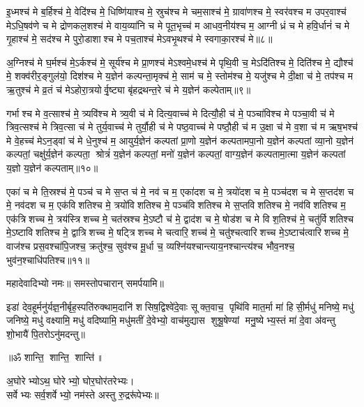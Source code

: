 इ॒ध्मश्च॑ मे ब॒र्हिश्च॑ मे॒ वेदि॑श्च मे॒ धिष्णि॑याश्च मे॒ स्रुच॑श्च मे चम॒साश्च॑ मे॒ ग्रावा॑णश्च मे॒ स्वर॑वश्च म उपर॒वाश्च॑ मेऽधि॒षव॑णे च मे द्रोणकल॒शश्च॑ मे वाय॒व्या॑नि च मे पूत॒भृच्च॑ म आधव॒नीय॑श्च म॒ आग्नीध्रं च मे हवि॒र्धानं॑ च मे गृ॒हाश्च॑ मे॒ सद॑श्च मे पुरो॒डाशाश्च मे पच॒ताश्च॑ मेऽवभृ॒थश्च॑ मे स्वगाका॒रश्च॑ मे॥८॥ 

अ॒ग्निश्च॑ मे घ॒र्मश्च॑ मे॒ऽर्कश्च॑ मे॒ सूर्य॑श्च मे प्रा॒णश्च॑ मेऽश्वमे॒धश्च॑ मे पृथि॒वी च॒ मेऽदि॑तिश्च मे॒ दिति॑श्च मे॒ द्यौश्च॑ मे॒ शक्व॑रीर॒ङ्गुल॑यो॒ दिश॑श्च मे य॒ज्ञेन॑ कल्पन्ता॒मृक्च॑ मे॒ साम॑ च मे॒ स्तोम॑श्च मे॒ यजु॑श्च मे दी॒क्षा च॑ मे॒ तप॑श्च म ऋ॒तुश्च॑ मे व्र॒तं च॑ मेऽहोरा॒त्रयोर्वृ॒ष्ट्या बृ॑हद्रथन्त॒रे च॑ मे य॒ज्ञेन॑ कल्पेताम्॥९॥ 

गर्भाश्च मे व॒त्साश्च॑ मे॒ त्र्यवि॑श्च मे त्र्य॒वी च॑ मे दित्य॒वाच्च॑ मे दित्यौ॒ही च॑ मे॒ पञ्चा॑विश्च मे पञ्चा॒वी च॑ मे त्रिव॒त्सश्च॑ मे त्रिव॒त्सा च॑ मे तुर्य॒वाच्च॑ मे तुर्यौ॒ही च॑ मे पष्ठ॒वाच्च॑ मे पष्ठौ॒ही च॑ म उ॒क्षा च॑ मे व॒शा च॑ म ऋष॒भश्च॑ मे वे॒हच्च॑ मेऽन॒ड्वां च॑ मे धे॒नुश्च॑ म॒ आयुर्य॒ज्ञेन॑ कल्पतां प्रा॒णो य॒ज्ञेन॑ कल्पतामपा॒नो य॒ज्ञेन॑ कल्पतां व्या॒नो य॒ज्ञेन॑ कल्पतां॒ चक्षु॑र्य॒ज्ञेन॑ कल्पता॒ श्रोत्रं॑ य॒ज्ञेन॑ कल्पतां॒ मनो॑ य॒ज्ञेन॑ कल्पतां॒ वाग्य॒ज्ञेन॑ कल्पतामा॒त्मा य॒ज्ञेन॑ कल्पतां य॒ज्ञो य॒ज्ञेन॑ कल्पताम्॥१०॥ 

एका॑ च मे ति॒स्रश्च॑ मे॒ पञ्च॑ च मे स॒प्त च॑ मे॒ नव॑ च म॒ एका॑दश च मे॒ त्रयो॑दश च मे॒ पञ्च॑दश च मे स॒प्तद॑श च मे॒ नव॑दश च म॒ एक॑विशतिश्च मे॒ त्रयो॑विशतिश्च मे॒ पञ्च॑विशतिश्च मे स॒प्तविशतिश्च मे॒ नव॑विशतिश्च म॒ एक॑त्रिशच्च मे॒ त्रय॑स्त्रिशच्च मे॒ चत॑स्रश्च मे॒ऽष्टौ च॑ मे॒ द्वाद॑श च मे॒ षोड॑श च मे विश॒तिश्च॑ मे॒ चतु॑र्विशतिश्च मे॒ऽष्टाविशतिश्च मे॒ द्वात्रिशच्च मे॒ षट्त्रिशच्च मे चत्वारि॒शच्च॑ मे॒ चतु॑श्चत्वारिशच्च मे॒ऽष्टाच॑त्वारिशच्च मे॒ वाज॑श्च प्रस॒वश्चा॑पि॒जश्च॒ क्रतु॑श्च॒ सुव॑श्च मू॒र्धा च॒ व्यश्नि॑यश्चान्त्याय॒नश्चान्त्य॑श्च भौव॒नश्च॒ भुव॑न॒श्चाधि॑पतिश्च॥११॥ 

महादेवादिभ्यो नमः॥ समस्तोपचारान् समर्पयामि॥

इडा॑ देव॒हूर्मनु॑र्यज्ञ॒नीर्बृह॒स्पति॑रुक्थाम॒दानि॑ शसिष॒द्विश्वे॑दे॒वाः सूक्त॒वाच॒ पृथि॑वि मात॒र्मा मा॑ हिसी॒र्मधु॑ मनिष्ये॒ मधु॑ जनिष्ये॒ मधु॑ वक्ष्यामि॒ मधु॑ वदिष्यामि॒ मधु॑मतीं दे॒वेभ्यो॒ वाच॑मुद्यास शुश्रू॒षेण्यां मनु॒ष्येभ्य॒स्तं मा॑ दे॒वा अ॑वन्तु शो॒भायै॑ पि॒तरोऽनु॑मदन्तु॥ 

\centerline{॥ॐ शान्ति॒ शान्ति॒ शान्ति॑॥}

{\small \closesection}

अ॒घोरेभ्योऽथ॒ घोरेभ्यो॒ घोर॒घोर॑तरेभ्यः।\\
सर्वेभ्यः सर्व॒शर्वेभ्यो॒ नम॑स्ते अस्तु रु॒द्ररू॑पेभ्यः॥

